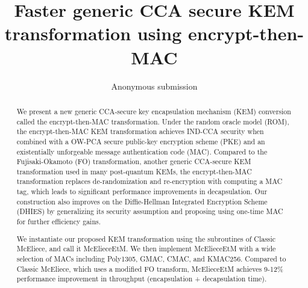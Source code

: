 \documentclass[runningheads]{llncs}
\begin{document}
\title{Faster generic CCA secure KEM transformation using encrypt-then-MAC}

\author{
    Anonymous submission
}

\institute{
}

\maketitle              %
%
\begin{abstract}
    We present a new generic CCA-secure key encapsulation mechanism (KEM) conversion called the encrypt-then-MAC transformation. Under the random oracle model (ROM), the encrypt-then-MAC KEM transformation achieves IND-CCA security when combined with a OW-PCA secure public-key encryption scheme (PKE) and an existentially unforgeable message authentication code (MAC). Compared to the Fujisaki-Okamoto (FO) transformation, another generic CCA-secure KEM transformation used in many post-quantum KEMs, the encrypt-then-MAC transformation replaces de-randomization and re-encryption with computing a MAC tag, which leads to significant performance improvements in decapsulation. Our construction also improves on the Diffie-Hellman Integrated Encryption Scheme (DHIES) by generalizing its security assumption and proposing using one-time MAC for further efficiency gains.
    
    We instantiate our proposed KEM transformation using the subroutines of Classic McEliece, and call it McElieceEtM. We then implement McElieceEtM with a wide selection of MACs including Poly1305, GMAC, CMAC, and KMAC256. Compared to Classic McEliece, which uses a modified FO transform, McElieceEtM achieves 9-12\% performance improvement in throughput (encapsulation + decapsulation time).
\end{abstract}
\end{document}
